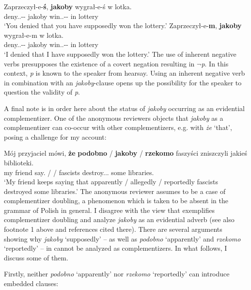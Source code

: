 \documentclass[output=paper]{langsci/langscibook}
\begin{document}
 \ea \ea \gll Zaprzeczył-e-\textbf{ś}, \textbf{jakoby} wygrał-e-ś w lotka.\\
  			deny.{\lptcp}.{\sg}-{\masc}-{\secondperson}{\sg} jakoby win.{\lptcp}.{\sg}-{\masc}-{\secondperson}{\sg} in lottery \\
	\glt	 `You denied that you have supposedly won the lottery.'
		\ex\gll	Zaprzeczył-e-\textbf{m}, \textbf{jakoby} wygrał-e-m w lotka.\\
  			deny.{\lptcp}.{\sg}-{\masc}-{\firstperson}{\sg} jakoby win.{\lptcp}.{\sg}-{\masc}-{\firstperson}{\sg} in lottery \\
	\glt		 `I denied that I have supposedly won the lottery.'
\z\z 
The use of inherent negative verbs presupposes the existence of a covert negation resulting in $\lnot$\emph{p}. In this context, \emph{p} is known to the speaker from hearsay. Using an inherent negative verb in combination with an \emph{jakoby}-clause opens up the possibility for the speaker to question the validity of \emph{p}.

A final note is in order here about the status of \emph{jakoby} occurring as an evidential complementizer. One of the anonymous reviewers objects that \emph{jakoby} as a complementizer can co-occur with other complementizers, e.g. with \emph{że} `that', posing a challenge for my account:

\ea \gll Mój przyjaciel mówi, \textbf{że} \textbf{podobno} / \textbf{jakoby} / \textbf{rzekomo} faszyści zniszczyli jakieś biblioteki.  \label{challenge} \\
		my friend say.{\thirdperson}{\sg} {\comp} {\comp} / {\comp} / {\comp}  fascists destroy.{\lptcp}.{\vir}.{\pl} some libraries. \\
\glt	 `My friend keeps saying that apparently / allegedly / reportedly fascists destroyed some libraries.'
\z
The anonymous reviewer assumes  to be a case of complementizer doubling, a phenomenon which is taken to be absent in the grammar of Polish in general. I disagree with the view that  exemplifies complementizer doubling and analyze \emph{jakoby}  as an evidential adverb (see also footnote 1 above and references cited there). There are several arguments showing why \emph{jakoby}  `supposedly' – as well as \emph{podobno} `apparently' and \emph{rzekomo} `reportedly' – in  cannot be analyzed as  complementizers. In what follows, I discuss some of them.

Firstly, neither \emph{podobno}  `apparently' nor \emph{rzekomo} `reportedly' can introduce embedded clauses:
\end{document}
